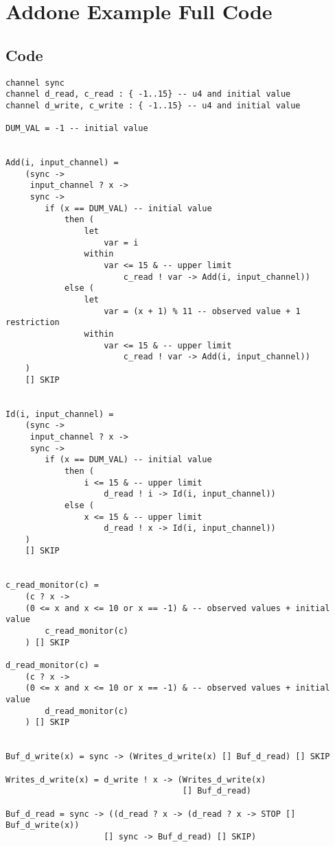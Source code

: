 \chapter{Addone Example Full \cspm{} Code}
\label{app:addone}
\section*{\cspm{} Code}
\begin{verbatim}
channel sync
channel d_read, c_read : { -1..15} -- u4 and initial value
channel d_write, c_write : { -1..15} -- u4 and initial value

DUM_VAL = -1 -- initial value


Add(i, input_channel) =
    (sync ->
     input_channel ? x ->
     sync ->
        if (x == DUM_VAL) -- initial value
            then (
                let
                    var = i
                within
                    var <= 15 & -- upper limit
                        c_read ! var -> Add(i, input_channel))
            else (
                let
                    var = (x + 1) % 11 -- observed value + 1 restriction
                within
                    var <= 15 & -- upper limit
                        c_read ! var -> Add(i, input_channel))
    )
    [] SKIP


Id(i, input_channel) =
    (sync ->
     input_channel ? x ->
     sync ->
        if (x == DUM_VAL) -- initial value
            then (
                i <= 15 & -- upper limit
                    d_read ! i -> Id(i, input_channel))
            else (
                x <= 15 & -- upper limit
                    d_read ! x -> Id(i, input_channel))
    )
    [] SKIP


c_read_monitor(c) =
    (c ? x ->
    (0 <= x and x <= 10 or x == -1) & -- observed values + initial value
        c_read_monitor(c)
    ) [] SKIP

d_read_monitor(c) =
    (c ? x ->
    (0 <= x and x <= 10 or x == -1) & -- observed values + initial value
        d_read_monitor(c)
    ) [] SKIP


Buf_d_write(x) = sync -> (Writes_d_write(x) [] Buf_d_read) [] SKIP

Writes_d_write(x) = d_write ! x -> (Writes_d_write(x)
                                    [] Buf_d_read)

Buf_d_read = sync -> ((d_read ? x -> (d_read ? x -> STOP [] Buf_d_write(x))
                    [] sync -> Buf_d_read) [] SKIP)




\end{verbatim}

